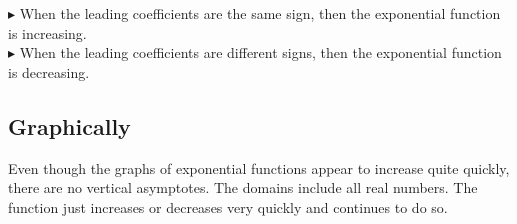 \documentclass{ximera}
\begin{document}
$\blacktriangleright$ When the leading coefficients are the same sign, then the exponential function is increasing. \\

$\blacktriangleright$ When the leading coefficients are different signs, then the exponential function is decreasing. \\




\subsection*{Graphically}

Even though the graphs of exponential functions appear to increase quite quickly, there are no vertical asymptotes.  The domains include all real numbers.  The function just increases or decreases very quickly and continues to do so.
\end{document}
